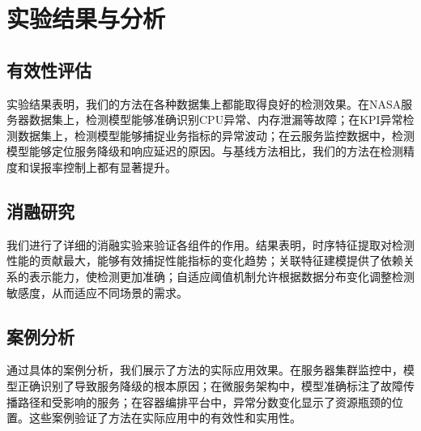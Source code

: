 \section{实验结果与分析}

\subsection{有效性评估}

实验结果表明，我们的方法在各种数据集上都能取得良好的检测效果。在NASA服务器数据集上，检测模型能够准确识别CPU异常、内存泄漏等故障；在KPI异常检测数据集上，检测模型能够捕捉业务指标的异常波动；在云服务监控数据中，检测模型能够定位服务降级和响应延迟的原因。与基线方法相比，我们的方法在检测精度和误报率控制上都有显著提升。

\subsection{消融研究}

我们进行了详细的消融实验来验证各组件的作用。结果表明，时序特征提取对检测性能的贡献最大，能够有效捕捉性能指标的变化趋势；关联特征建模提供了依赖关系的表示能力，使检测更加准确；自适应阈值机制允许根据数据分布变化调整检测敏感度，从而适应不同场景的需求。

\subsection{案例分析}

通过具体的案例分析，我们展示了方法的实际应用效果。在服务器集群监控中，模型正确识别了导致服务降级的根本原因；在微服务架构中，模型准确标注了故障传播路径和受影响的服务；在容器编排平台中，异常分数变化显示了资源瓶颈的位置。这些案例验证了方法在实际应用中的有效性和实用性。
